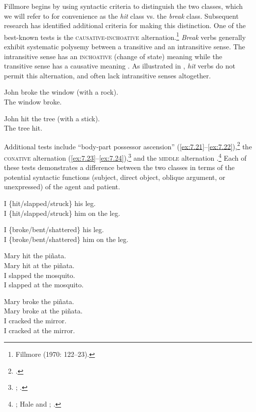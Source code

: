 Fillmore begins by using syntactic criteria to distinguish the two classes, which we will refer to for convenience as the \textit{hit} class vs. the \textit{break} class. Subsequent research has identified additional criteria for making this distinction. One of the best-known tests is the \textsc{causative-inchoative} alternation.\footnote{Fillmore (1970: 122–23).} \textit{Break} verbs generally exhibit systematic polysemy between a transitive and an intransitive sense. The intransitive sense has an \textsc{inchoative} (change of state) meaning while the transitive sense has a causative meaning . As illustrated in , \textit{hit} verbs do not permit this alternation, and often lack intransitive senses altogether.


\ea \label{ex:7.19}
\ea  John broke the window (with a rock).\\
\ex  The window broke.
                       \z
\z

\ea \label{ex:7.20}
\ea  John hit the tree (with a stick).\\
\ex *The tree hit.
                       \z
\z


Additional tests include “body-part possessor ascension” (\ref{ex:7.21}--\ref{ex:7.22}),\footnote{\citet[126]{Fillmore1970}.} the \textsc{conative} alternation (\ref{ex:7.23}--\ref{ex:7.24}),\footnote{\citet{GuersselEtAl1985}; \citet{Levin1993}.} and the \textsc{middle} alternation .\footnote{\citet{Fillmore1977}; Hale and \citet{Keyser1987}; \citet{Levin1993}.} Each of these tests demonstrates a difference between the two classes in terms of the potential syntactic functions (subject, direct object, oblique argument, or unexpressed) of the agent and patient.


\ea \label{ex:7.21}
\ea  I \{hit/slapped/struck\} his leg.\\
\ex  I \{hit/slapped/struck\} him on the leg.
                       \z
\z

\ea \label{ex:7.22}
\ea  I \{broke/bent/shattered\} his leg.\\
\ex *I \{broke/bent/shattered\} him on the leg.
                       \z
\z

\ea \label{ex:7.23}
\ea  Mary hit the piñata.\\
\ex  Mary hit at the piñata.\\
\ex  I slapped the mosquito.\\
\ex  I slapped at the mosquito.
                       \z
\z

\ea \label{ex:7.24}
\ea  Mary broke the piñata.\\
\ex  *Mary broke at the piñata.\\
\ex  I cracked the mirror.\\
\ex  *I cracked at the mirror.
                       \z
\z

